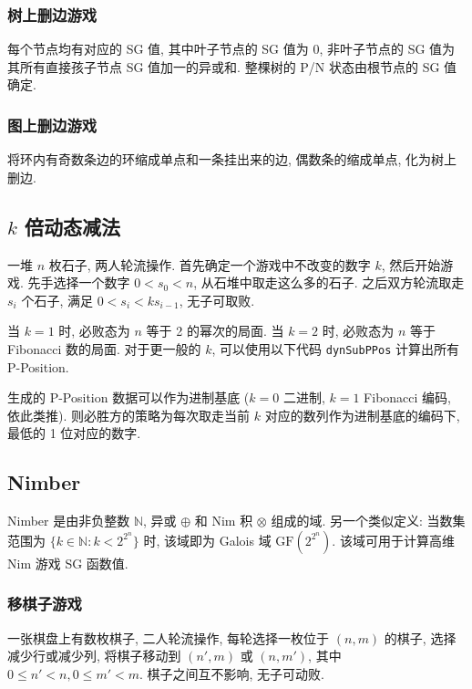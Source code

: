 \subsubsection{树上删边游戏}
每个节点均有对应的 SG 值, 其中叶子节点的 SG 值为 0, 非叶子节点的 SG 值为其所有直接孩子节点 SG 值加一的异或和. 整棵树的 P/N 状态由根节点的 SG 值确定.

\subsubsection{图上删边游戏}
将环内有奇数条边的环缩成单点和一条挂出来的边, 偶数条的缩成单点, 化为树上删边.



\subsection{\(k\) 倍动态减法}
一堆 $n$ 枚石子, 两人轮流操作. 首先确定一个游戏中不改变的数字 $k$, 然后开始游戏. 先手选择一个数字 $0<s_0<n$, 从石堆中取走这么多的石子. 之后双方轮流取走 $s_i$ 个石子, 满足 $0<s_i<ks_{i-1}$, 无子可取败.

当 $k=1$ 时, 必败态为 $n$ 等于 2 的幂次的局面. 当 $k=2$ 时, 必败态为 $n$ 等于 Fibonacci 数的局面. 对于更一般的 $k$, 可以使用以下代码 \lstinline{dynSubPPos} 计算出所有 P-Position.

生成的 P-Position 数据可以作为进制基底 ($k=0$ 二进制, $k=1$ Fibonacci 编码, 依此类推). 则必胜方的策略为每次取走当前 $k$ 对应的数列作为进制基底的编码下, 最低的 1 位对应的数字.



\subsection{Nimber}
Nimber 是由非负整数 $\mathbb N$, 异或 $\oplus$ 和 Nim 积 $\otimes$ 组成的域. 另一个类似定义: 当数集范围为 $\{k\in\mathbb N:k<2^{2^n}\}$ 时, 该域即为 Galois 域 $\mathrm{GF}(2^{2^n})$. 该域可用于计算高维 Nim 游戏 SG 函数值.

\subsubsection{移棋子游戏 \uppercase\expandafter{}}
一张棋盘上有数枚棋子, 二人轮流操作, 每轮选择一枚位于 $(n,m)$ 的棋子, 选择减少行或减少列, 将棋子移动到 $(n',m)$ 或 $(n,m')$, 其中 $0\le n'<n,0\le m'<m$. 棋子之间互不影响, 无子可动败.

